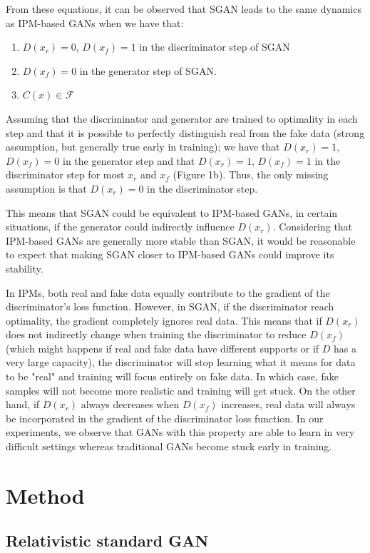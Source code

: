 \documentclass{article}
\begin{document}
From these equations, it can be observed that SGAN leads to the same dynamics as IPM-based GANs when we have that:
\begin{enumerate}
	\item $D(x_r)=0$, $D(x_f)=1$ in the discriminator step of SGAN
	\item $D(x_f)=0$ in the generator step of SGAN.
	\item $C(x) \in \mathcal{F}$
\end{enumerate}
Assuming that the discriminator and generator are trained to optimality in each step and that it is possible to perfectly distinguish real from the fake data (strong assumption, but generally true early in training); we have that $D(x_r)=1$, $D(x_f)=0$ in the generator step and that $D(x_r)=1$, $D(x_f)=1$ in the discriminator step for most $x_r$ and $x_f$ (Figure 1b). Thus, the only missing assumption is that $D(x_r)=0$ in the discriminator step. 

This means that SGAN could be equivalent to IPM-based GANs, in certain situations, if the generator could indirectly influence $D(x_r)$. Considering that IPM-based GANs are generally more stable than SGAN, it would be reasonable to expect that making SGAN closer to IPM-based GANs could improve its stability. 

In IPMs, both real and fake data equally contribute to the gradient of the discriminator's loss function. However, in SGAN, if the discriminator reach optimality, the gradient completely ignores real data. This means that if $D(x_r)$ does not indirectly change when training the discriminator to reduce $D(x_f)$ (which might happens if real and fake data have different supports or if $D$ has a very large capacity), the discriminator will stop learning what it means for data to be "real" and training will focus entirely on fake data. In which case, fake samples will not become more realistic and training will get stuck. On the other hand, if $D(x_r)$ always decreases when $D(x_f)$ increases, real data will always be incorporated in the gradient of the discriminator loss function. In our experiments, we observe that GANs with this property are able to learn in very difficult settings whereas traditional GANs become stuck early in training.

\section{Method}

\subsection{Relativistic standard GAN}
\end{document}
